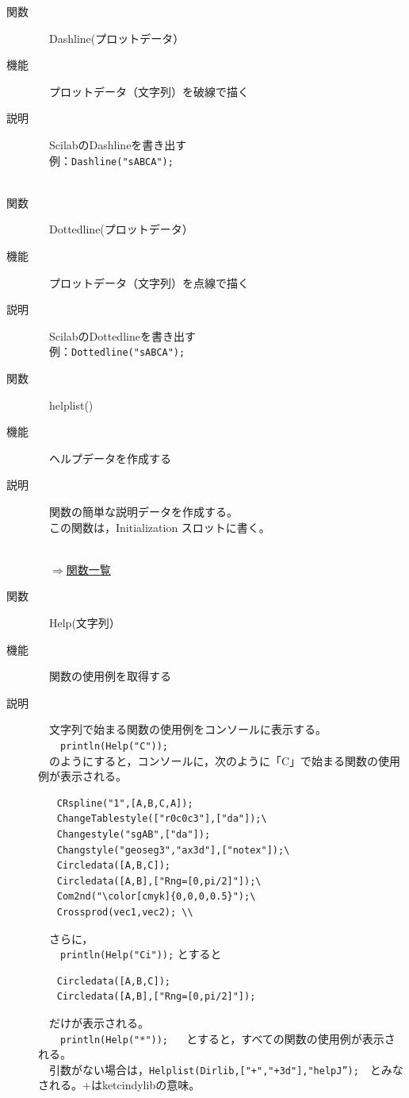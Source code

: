 \documentclass[papersize,a4paper,12pt,uplatex]{jsarticle}
\begin{document}
\begin{description}
\hypertarget{dashline}{}
\item[関数]　Dashline(プロットデータ）
\item[機能]　プロットデータ（文字列）を破線で描く
\item[説明]　ScilabのDashlineを書き出す\\
　例：\verb|Dashline("sABCA");|\\
\\
\hypertarget{dottedline}{}
\item[関数]　Dottedline(プロットデータ）
\item[機能]　プロットデータ（文字列）を点線で描く
\item[説明]　ScilabのDottedlineを書き出す\\
　例：\verb|Dottedline("sABCA");|\\

\hypertarget{helplist}{}
\item[関数]　helplist()
\item[機能]　ヘルプデータを作成する
\item[説明]　関数の簡単な説明データを作成する。\\
　この関数は，Initialization スロットに書く。\\
　\\

\begin{flushright}　\hyperlink{functionlist}{$\Rightarrow$関数一覧}\end{flushright}
\hypertarget{help}{}
\item[関数]　Help(文字列）
\item[機能]　関数の使用例を取得する
\item[説明]　文字列で始まる関数の使用例をコンソールに表示する。\\
　　\verb|println(Help("C"));|\\
　のようにすると，コンソールに，次のように「C」で始まる関数の使用例が表示される。
\begin{verbatim}
　　CRspline("1",[A,B,C,A]); 
　　ChangeTablestyle(["r0c0c3"],["da"]);\
　　Changestyle("sgAB",["da"]); 
　　Changstyle("geoseg3","ax3d"],["notex"]);\
　　Circledata([A,B,C]); 
　　Circledata([A,B],["Rng=[0,pi/2]"]);\
　　Com2nd("\color[cmyk]{0,0,0,0.5}");\
　　Crossprod(vec1,vec2); \\
\end{verbatim}

　さらに，\\
　　\verb|println(Help("Ci"));| とすると
\begin{verbatim}
　　Circledata([A,B,C]); 
　　Circledata([A,B],["Rng=[0,pi/2]"]);
\end{verbatim}
　だけが表示される。\\
　　\verb|println(Help("*"));|
　 とすると，すべての関数の使用例が表示される。\\
　引数がない場合は，\verb|Helplist(Dirlib,["+","+3d"],"helpJ”);|　とみなされる。+はketcindylibの意味。\\
\\


\end{description}
\end{document}
